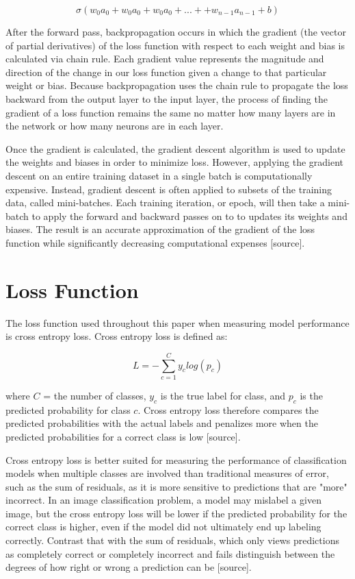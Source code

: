 \documentclass [MAS] {uclathes}
\begin{document}
\[\sigma(w_0a_0 + w_0a_0 + w_0a_0 + ... + + w_{n-1}a_{n-1} + b)\]

After the forward pass, backpropagation occurs in which the gradient (the vector of partial derivatives) of the loss 
function with respect to each weight and bias is calculated via chain rule. Each gradient value represents the magnitude 
and direction of the change in our loss function given a change to that particular weight or bias. Because 
backpropagation uses the chain rule to propagate the loss backward from the output layer to the input layer, the process 
of finding the gradient of a loss function remains the same no matter how many layers are in the network or how many 
neurons are in each layer.

Once the gradient is calculated, the gradient descent algorithm is used to update the weights and biases in order to 
minimize loss. However, applying the gradient descent on an entire training dataset in a single batch is computationally 
expensive. Instead, gradient descent is often applied to subsets of the training data, called mini-batches. Each 
training iteration, or epoch, will then take a mini-batch to apply the forward and backward passes on to to updates its 
weights and biases. The result is an accurate approximation of the gradient of the loss function while significantly 
decreasing computational expenses [source].

\section{Loss Function}
The loss function used throughout this paper when measuring model performance is cross entropy loss. Cross entropy loss 
is defined as:

\[L = -\sum_{c=1}^{C}y_{c}log(p_{c})\]

where \(C\) = the number of classes, \(y_{c}\) is the true label for class, and \(p_{c}\) is the predicted probability 
for class \(c\). Cross entropy loss therefore compares the predicted probabilities with the actual labels and penalizes 
more when the predicted probabilities for a correct class is low [source].

Cross entropy loss is better suited for measuring the performance of classification models when multiple classes are 
involved than traditional measures of error, such as the sum of residuals, as it is more sensitive to predictions that 
are "more" incorrect. In an image classification problem, a model may mislabel a given image, but the cross entropy loss 
will be lower if the predicted probability for the correct class is higher, even if the model did not ultimately end up 
labeling correctly. Contrast that with the sum of residuals, which only views predictions as completely correct or 
completely incorrect and fails distinguish between the degrees of how right or wrong a prediction can be [source].
\end{document}
